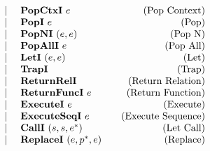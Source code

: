 \begin{align*}
\begin{array}{lcccrlr}
    &&&& | & ~ \textbf{PopCtxI} ~ e &\quad\text{(Pop Context)} \\
    &&&& | & ~ \textbf{PopI} ~ e &\quad\text{(Pop)} \\
    &&&& | & ~ \textbf{PopNI} ~ (e, e) &\quad\text{(Pop N)} \\
    &&&& | & ~ \textbf{PopAllI} ~ e &\quad\text{(Pop All)} \\
    &&&& | & ~ \textbf{LetI} ~ (e, e) &\quad\text{(Let)} \\
    &&&& | & ~ \textbf{TrapI} &\quad\text{(Trap)} \\
    &&&& | & ~ \textbf{ReturnRelI} &\quad\text{(Return Relation)} \\
    &&&& | & ~ \textbf{ReturnFuncI} ~ e &\quad\text{(Return Function)} \\
    &&&& | & ~ \textbf{ExecuteI} ~ e &\quad\text{(Execute)} \\
    &&&& | & ~ \textbf{ExecuteSeqI} ~ e &\quad\text{(Execute Sequence)} \\
    &&&& | & ~ \textbf{CallI} ~ (s, s, e^*) &\quad\text{(Let Call)} \\
    &&&& | & ~ \textbf{ReplaceI} ~ (e, p^*, e) &\quad\text{(Replace)} \\
\end{array}
\end{align*}
\newpage
